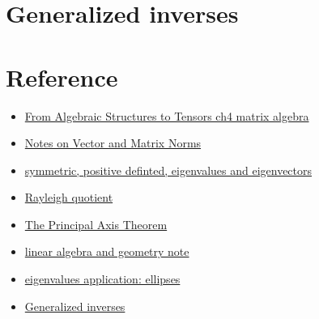 \section{Generalized inverses}

\section{Reference}
\begin{itemize}
    \item \href{}{From Algebraic Structures to Tensors ch4 matrix algebra}
    \item \href{https://www.cs.utexas.edu/users/flame/Notes/NotesOnNorms.pdf}{Notes on Vector and Matrix Norms}
    \item \href{https://ocw.mit.edu/courses/15-084j-nonlinear-programming-spring-2004/resources/lec4_quad_form/}{symmetric, positive definted, eigenvalues and eigenvectors}
    \item \href{https://www.cmor-faculty.rice.edu/~caam440/chapter2.pdf}{Rayleigh quotient}
    \item \href{https://www.math.uwaterloo.ca/~jmckinno/Math225/Week7/Lecture2m.pdf}{The Principal Axis Theorem}
    \item \href{https://staff.polito.it/ada.boralevi/didattica/Dispense_ENG.pdf}{linear algebra and geometry note}
    \item \href{http://jde27.uk/la/36_eigenapplications2.html}{eigenvalues application: ellipses}
    \item \href{https://www.sjsu.edu/faculty/guangliang.chen/Math253S20/lec6ginverse.pdf}{Generalized inverses}
\end{itemize}
